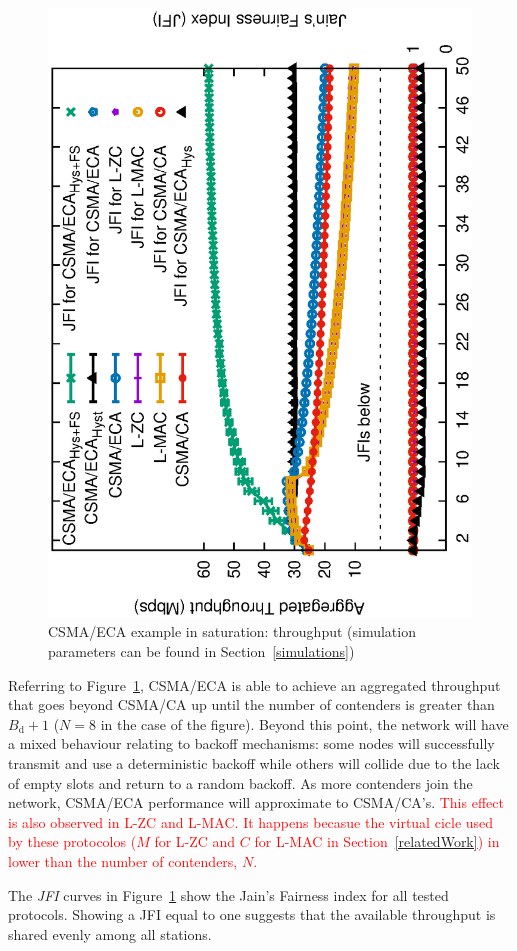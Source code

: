 \begin{figure}[tb]
\centering
  \includegraphics[width=0.7\linewidth, angle=-90]{figures/tonFigs/DCF-v-ECA-TON.eps}
  \caption{CSMA/ECA example in saturation: throughput (simulation parameters can be found in Section~\ref{simulations})}
  \label{fig:BECA}
\end{figure}

Referring to Figure~\ref{fig:BECA}, CSMA/ECA is able to achieve an aggregated throughput that goes beyond CSMA/CA up until the number of contenders is greater than $B_{\text{d}}+1$ ($N=8$ in the case of the figure). Beyond this point, the network will have a mixed behaviour relating to backoff mechanisms: some nodes will successfully transmit and use a deterministic backoff while others will collide due to the lack of empty slots and return to a random backoff. As more contenders join the network, CSMA/ECA performance will approximate to CSMA/CA's. \textcolor{red}{This effect is also observed in L-ZC and L-MAC. It happens becasue the virtual cicle used by these protocolos ($M$ for L-ZC and $C$ for L-MAC in Section~\ref{relatedWork}) in lower than the number of contenders, $N$.}

The \emph{JFI } curves in Figure~\ref{fig:BECA} show the Jain's Fairness index for all tested protocols. Showing a JFI equal to one suggests that the available throughput is shared evenly among all stations.

